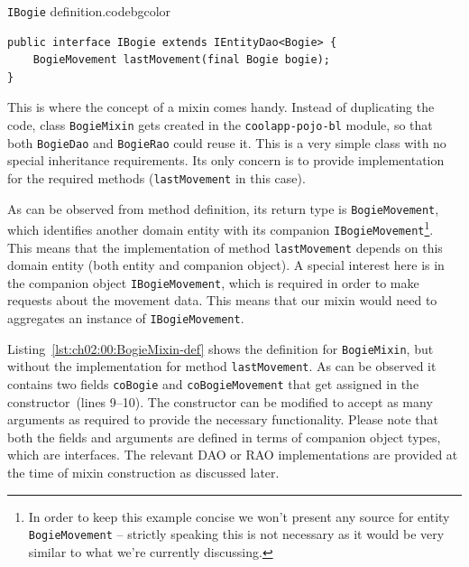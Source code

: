   \begin{code}{\texttt{IBogie} definition.}{\label{lst:ch02:00:IBogie}}{codebgcolor}
    \begin{lstlisting}
public interface IBogie extends IEntityDao<Bogie> {
    BogieMovement lastMovement(final Bogie bogie);
}
    \end{lstlisting}
  \end{code}
  
  This is where the concept of a mixin comes handy.
  Instead of duplicating the code, class \texttt{BogieMixin} gets created in the \texttt{coolapp-pojo-bl} module, so that both  \texttt{BogieDao} and \texttt{BogieRao} could reuse it.
  This is a very simple class with no special inheritance requirements.
  Its only concern is to provide implementation for the required methods (\texttt{lastMovement} in this case).
  
  As can be observed from method definition, its return type is \texttt{BogieMovement}, which identifies another domain entity with its companion \texttt{IBogieMovement}\footnote{In order to keep this example concise we won't present any source for entity \texttt{BogieMovement} -- strictly speaking this is not necessary as it would be very similar to what we're currently discussing.}.
  This means that the implementation of method \texttt{lastMovement} depends on this domain entity (both entity and companion object).
  A special interest here is in the companion object \texttt{IBogieMovement}, which is required in order to make requests about the movement data.
  This means that our mixin would need to aggregates an instance of \texttt{IBogieMovement}.
  
  Listing~\ref{lst:ch02:00:BogieMixin-def} shows the definition for \texttt{BogieMixin}, but without the implementation for method \texttt{lastMovement}.
  As can be observed it contains two fields \texttt{coBogie} and \texttt{coBogieMovement} that get assigned in the constructor~(lines 9--10).
  The constructor can be modified to accept as many arguments as required to provide the necessary functionality.
  Please note that both the fields and arguments are defined in terms of companion object types, which are interfaces.
  The relevant DAO or RAO implementations are provided at the time of mixin construction as discussed later.
  
